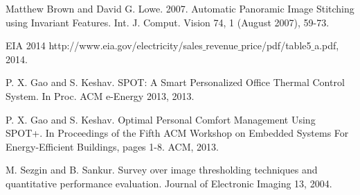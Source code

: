 \documentclass{sig-alternate}
\begin{document}
\begin{thebibliography}{9}
  Matthew Brown and David G. Lowe. 2007. Automatic Panoramic Image Stitching using Invariant Features. Int. J. Comput. Vision 74, 1 (August 2007), 59-73.

 EIA 2014  http://www.eia.gov/electricity/sales$\_$revenue$\_$price/pdf/table5$\_$a.pdf, 2014. 
       
 P. X. Gao and S. Keshav. SPOT: A Smart Personalized Office Thermal Control System. In Proc. ACM e-Energy 2013, 2013.

 P. X. Gao and S. Keshav. Optimal Personal Comfort Management Using SPOT+. In Proceedings of the Fifth ACM Workshop on Embedded Systems For Energy-Efficient Buildings, pages 1-8. ACM, 2013. 

 M. Sezgin and B. Sankur. Survey over image thresholding techniques and quantitative performance evaluation. Journal of Electronic Imaging 13, 2004.

\end{thebibliography}
\end{document}
